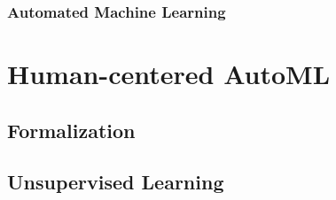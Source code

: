 \documentclass[a4paper,12pt,times,numbered,print,index]{Classes/PhDThesisPSnPDF}
\begin{document}




\section{Automated Machine Learning}\label{automl-background-sec:automl}





\part{Human-centered AutoML}\label{part:automl}


\chapter{Formalization}\label{automl-chap:formalization}

% 

% 
% 
% 


\chapter{Unsupervised Learning}
\label{automl-chap:unsupervised}
\end{document}
